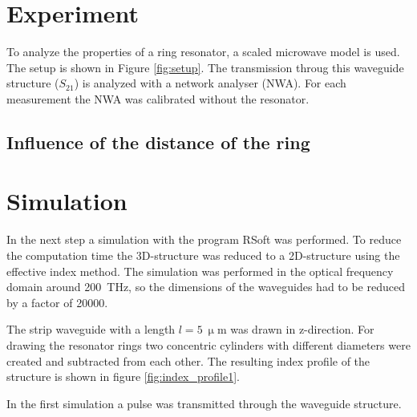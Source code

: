 \chapter{Experiment}

To analyze the properties of a ring resonator, a scaled microwave model is used. The setup is shown in Figure \ref{fig:setup}. The transmission throug this waveguide structure ($S_{21}$) is analyzed with a network analyser (NWA). For each measurement the NWA was calibrated without the resonator.

\section{Influence of the distance of the ring}




\chapter{Simulation}

In the next step a simulation with the program RSoft was performed. To reduce the computation time the 3D-structure was reduced to a 2D-structure using the effective index method. The simulation was performed in the optical frequency domain around 200~THz, so the dimensions of the waveguides had to be reduced by a factor of 20000. 

The strip waveguide with a length $l=5~\upmu$m was drawn in z-direction. For drawing the resonator rings two concentric cylinders with different diameters were created and subtracted from each other. The resulting index profile of the structure is shown in figure \ref{fig:index_profile1}.

In the first simulation a pulse was transmitted through the waveguide structure.


